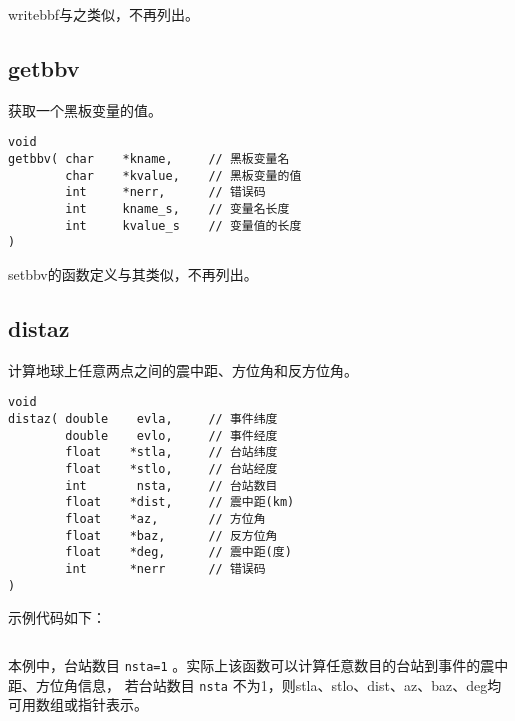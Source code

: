 writebbf与之类似，不再列出。

\subsection{getbbv}
获取一个黑板变量的值。
\begin{verbatim}
void
getbbv( char    *kname,     // 黑板变量名
        char    *kvalue,    // 黑板变量的值
        int     *nerr,      // 错误码
        int     kname_s,    // 变量名长度
        int     kvalue_s    // 变量值的长度
)
\end{verbatim}
setbbv的函数定义与其类似，不再列出。

\subsection{distaz}
计算地球上任意两点之间的震中距、方位角和反方位角。
\begin{verbatim}
void
distaz( double    evla,     // 事件纬度
        double    evlo,     // 事件经度
        float    *stla,     // 台站纬度
        float    *stlo,     // 台站经度
        int       nsta,     // 台站数目
        float    *dist,     // 震中距(km)
        float    *az,       // 方位角
        float    *baz,      // 反方位角
        float    *deg,      // 震中距(度)
        int      *nerr      // 错误码
)
\end{verbatim}
示例代码如下：
\inputminted{c}{./libs/distaz.c}
本例中，台站数目 \texttt{nsta=1} 。实际上该函数可以计算任意数目的台站到事件的震中距、方位角信息，
若台站数目 \texttt{nsta} 不为1，则stla、stlo、dist、az、baz、deg均可用数组或指针表示。
